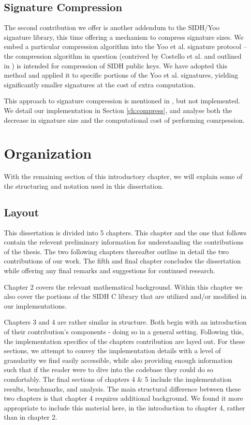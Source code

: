 \subsection{Signature Compression}

The second contribution we offer is another addendum to the SIDH/Yoo signature library, this time offering a mechanism to  compress signature sizes.  We embed a particular compression algorithm into the Yoo et al. signature protocol -- the compression algorithm in question (contrived by Costello et al. and outlined in \cite{pkcomp}) is intended for compression of SIDH public keys. We have adopted this method and applied it to specific portions of the Yoo et al. signatures, yielding significantly smaller signatures at the cost of extra computation.

This approach to signature compression is mentioned in \cite{yoo}, but not implemented. We detail our implementation in Section \ref{ch:compress}, and analyse both the decrease in signature size and the computational cost of performing comrpession. 

\section{Organization}

With the remaining section of this introductory chapter, we will explain some of the structuring and notation used in this dissertation.

\subsection{Layout}

This dissertation is divided into 5 chapters. This chapter and the one that follows contain the relevent preliminary information for understanding the contributions of the thesis. The two following chapters thereafter outline in detail the two contributions of our work. The fifth and final chapter concludes the dissertation while offering any final remarks and suggestions for continued research.

Chapter 2 covers the relevant mathematical background. Within this chapter we also cover the portions of the SIDH C library that are utilized and/or modified in our implementations.

Chapters 3 and 4 are rather similar in structure. Both begin with an introduction of their contribution's components - doing so in a general setting. Following this, the implementation specifics of the chapters contribution are layed out. For these sections, we attempt to convey the implementation details with a level of granularity we find easily accessible, while also providing enough information such that if the reader were to dive into the codebase they could do so comfortably. The final sections of chapters 4 \& 5 include the implementation results, benchmarks, and analysis. The main structural difference between these two chapters is that chapter 4 requires additional background. We found it more appropriate to include this material here, in the introduction to chapter 4, rather than in chapter 2.

